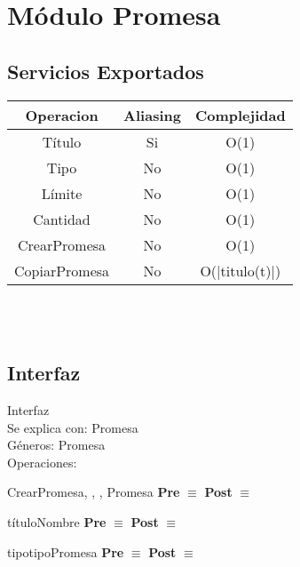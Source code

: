 \section{M\'odulo Promesa}

\subsection{Servicios Exportados}

\begin{tabular}[c]{|c|c|c|}
	
	\hline
		Operacion & Aliasing & Complejidad \\
		\hline
		T\'itulo & Si &  O(1)\\
		\hline
		Tipo & No & O(1)\\
		\hline
		L\'imite & No & O(1)\\
		\hline
		Cantidad& No & O(1)\\
		\hline
		CrearPromesa & No & O(1)\\
		\hline
		CopiarPromesa & No & O(|titulo(t)|)\\
		\hline
	\end{tabular}\\\\


\subsection{Interfaz}
	Interfaz \\
	Se explica con: Promesa \\
	G\'{e}neros: Promesa \\
	Operaciones:\\
	
	\begin{interfaz}{CrearPromesa}{, , , }{Promesa}{}
	\textbf{Pre} $\equiv$ 
	\textbf{Post} $\equiv$
	\end{interfaz}
	
	\begin{interfaz}{t\'itulo}{}{Nombre}{}
	\textbf{Pre} $\equiv$ 
	\textbf{Post} $\equiv$
	\end{interfaz}
	
	\begin{interfaz}{tipo}{}{tipoPromesa}{}
	\textbf{Pre} $\equiv$ 
	\textbf{Post} $\equiv$ 
	\end{interfaz}
	
